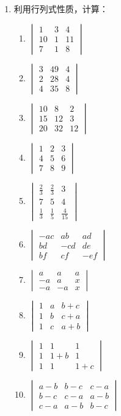\begin{ex}
\begin{enumerate}
    \item 利用行列式性质，计算：
\begin{multicols}{2}
\begin{enumerate}
    \item $\begin{vmatrix}
        1&3&4\\10&1&11\\7&1&8
    \end{vmatrix}$
    \item $\begin{vmatrix}
        3&49&4\\2&28&4\\4&35&8
    \end{vmatrix}$
    \item $\begin{vmatrix}
        10&8&2\\15&12&3\\20&32&12
    \end{vmatrix}$
    \item $\begin{vmatrix}
        1&2&3\\4&5&6\\7&8&9
    \end{vmatrix}$
    \item $\begin{vmatrix}
        \frac{2}{3}&\frac{2}{3}&3\\
        7&5&4\\
        \frac{1}{3}&\frac{1}{5}&\frac{4}{15}
    \end{vmatrix}$
    \item $\begin{vmatrix}
        -ac&ab&ad\\bd&-cd&de\\bf&cf&-ef
    \end{vmatrix}$
    \item $\begin{vmatrix}
        a&a&a\\-a&a&x\\-a&-a&x
    \end{vmatrix}$
    \item $\begin{vmatrix}
        1&a&b+c\\1&b&c+a\\1&c&a+b
    \end{vmatrix}$
    \item $\begin{vmatrix}
        1&1&1\\1&1+b&1\\1&1&1+c
    \end{vmatrix}$
    \item $\begin{vmatrix}
        a-b&b-c&c-a\\b-c&c-a&a-b\\c-a&a-b&b-c
    \end{vmatrix}$
\end{enumerate}
\end{multicols}


\end{enumerate}
\end{ex}

